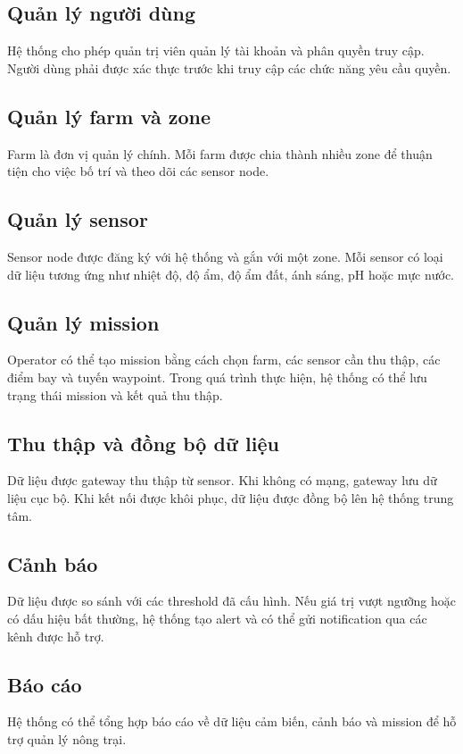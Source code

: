 
\subsection{Quản lý người dùng}
Hệ thống cho phép quản trị viên quản lý tài khoản và phân quyền truy cập. Người dùng phải được xác thực trước khi truy cập các chức năng yêu cầu quyền.

\subsection{Quản lý farm và zone}
Farm là đơn vị quản lý chính. Mỗi farm được chia thành nhiều zone để thuận tiện cho việc bố trí và theo dõi các sensor node.

\subsection{Quản lý sensor}
Sensor node được đăng ký với hệ thống và gắn với một zone. Mỗi sensor có loại dữ liệu tương ứng như nhiệt độ, độ ẩm, độ ẩm đất, ánh sáng, pH hoặc mực nước.

\subsection{Quản lý mission}
Operator có thể tạo mission bằng cách chọn farm, các sensor cần thu thập, các điểm bay và tuyến waypoint. Trong quá trình thực hiện, hệ thống có thể lưu trạng thái mission và kết quả thu thập.

\subsection{Thu thập và đồng bộ dữ liệu}
Dữ liệu được gateway thu thập từ sensor. Khi không có mạng, gateway lưu dữ liệu cục bộ. Khi kết nối được khôi phục, dữ liệu được đồng bộ lên hệ thống trung tâm.

\subsection{Cảnh báo}
Dữ liệu được so sánh với các threshold đã cấu hình. Nếu giá trị vượt ngưỡng hoặc có dấu hiệu bất thường, hệ thống tạo alert và có thể gửi notification qua các kênh được hỗ trợ.

\subsection{Báo cáo}
Hệ thống có thể tổng hợp báo cáo về dữ liệu cảm biến, cảnh báo và mission để hỗ trợ quản lý nông trại.
